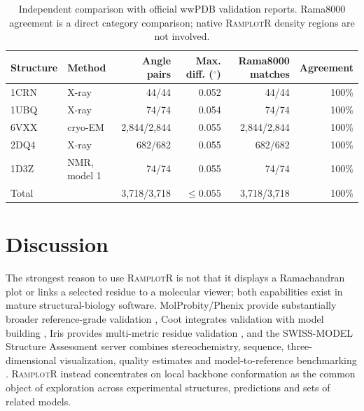 \documentclass[11pt]{article}
\newcommand{\ramplotr}{\textsc{RamplotR}\xspace}
\begin{document}
\begin{table}[ht]
\centering
\caption{Independent comparison with official wwPDB validation reports. Rama8000 agreement is a direct category comparison; native \ramplotr density regions are not involved.}
\label{tab:wwpdb}
\small
\begin{tabular}{llrrrr}
\toprule
Structure & Method & Angle pairs & Max. diff. ($^\circ$) & Rama8000 matches & Agreement\\
\midrule
1CRN & X-ray & 44/44 & 0.052 & 44/44 & 100\%\\
1UBQ & X-ray & 74/74 & 0.054 & 74/74 & 100\%\\
6VXX & cryo-EM & 2,844/2,844 & 0.055 & 2,844/2,844 & 100\%\\
2DQ4 & X-ray & 682/682 & 0.055 & 682/682 & 100\%\\
1D3Z & NMR, model 1 & 74/74 & 0.055 & 74/74 & 100\%\\
\midrule
Total & & 3,718/3,718 & $\leq0.055$ & 3,718/3,718 & 100\%\\
\bottomrule
\end{tabular}
\end{table}

\section{Discussion}

The strongest reason to use \ramplotr is not that it displays a Ramachandran plot or links a selected residue to a molecular viewer; both capabilities exist in mature structural-biology software. MolProbity/Phenix provide substantially broader reference-grade validation \citep{Williams2018,Liebschner2019}, Coot integrates validation with model building \citep{Emsley2010}, Iris provides multi-metric residue validation \citep{Rochira2021}, and the SWISS-MODEL Structure Assessment server combines stereochemistry, sequence, three-dimensional visualization, quality estimates and model-to-reference benchmarking \citep{Waterhouse2024}. \ramplotr instead concentrates on local backbone conformation as the common object of exploration across experimental structures, predictions and sets of related models.
\end{document}
